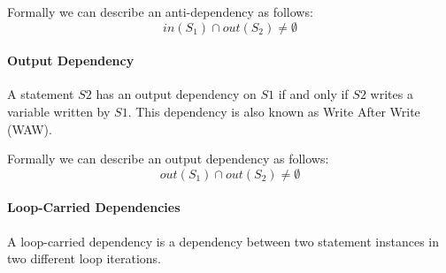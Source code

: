 Formally we can describe an anti-dependency as follows:
\begin{equation*}
    in(S_1) \cap out(S_2) \neq \emptyset
\end{equation*}

\paragraph{Output Dependency}
A statement $S2$ has an output dependency on $S1$ if and only if $S2$ writes a variable written by $S1$.
This dependency is also known as Write After Write (WAW).

Formally we can describe an output dependency as follows:
\begin{equation*}
    out(S_1) \cap out(S_2) \neq \emptyset
\end{equation*}

\paragraph{Loop-Carried Dependencies}
A loop-carried dependency is a dependency between two statement instances in two different loop iterations.